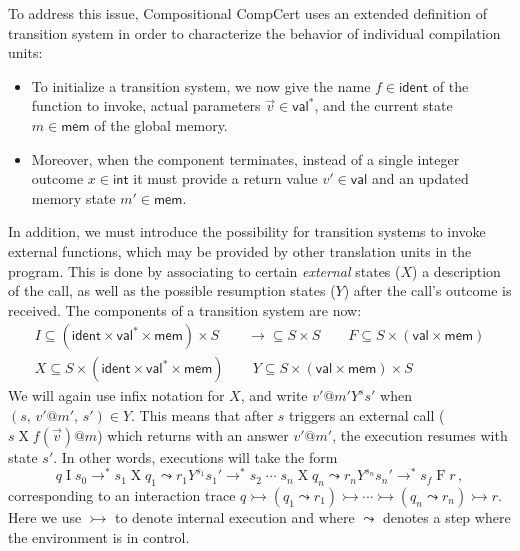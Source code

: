 \documentclass[acmsmall,screen,review,anonymous]{acmart}
\newcommand{\kw}[1]{\ensuremath{ \mathsf{#1} }}
\begin{document}
To address this issue,
Compositional CompCert \cite{compcompcert}
uses an extended definition of transition system
in order to
characterize the behavior of individual compilation units:
\begin{itemize}
\item
To initialize a transition system,
we now give the name $f \in \kw{ident}$
of the function to invoke,
actual parameters $\vec{v} \in \kw{val}^*$,
and the current state $m \in \kw{mem}$ of the global memory.
\item
Moreover,
when the component terminates,
instead of a single integer outcome $x \in \kw{int}$ it must provide
a return value $v' \in \kw{val}$ and an updated memory state $m' \in \kw{mem}$.
\end{itemize}
In addition,
we must introduce the possibility for transition systems
to invoke external functions,
which may be provided by other translation units in the program.
This is done by associating to certain \emph{external} states ($X$)
a description of the call,
as well as the possible resumption states ($Y$)
after the call's outcome is received.
The components of a transition system are now:
\begin{equation}
 \begin{array}{c}
  I \subseteq (\kw{ident} \times \kw{val}^* \times \kw{mem}) \times S
  \qquad
  {\rightarrow} \subseteq S \times S
  \qquad
  F \subseteq S \times (\kw{val} \times \kw{mem})
  \\
  X \subseteq S \times (\kw{ident} \times \kw{val}^* \times \kw{mem})
  \qquad
  Y \subseteq S \times (\kw{val} \times \kw{mem}) \times S
 \end{array}
 \label{eqn:compcomp-lts}
\end{equation}
We will again use infix notation for $X$,
and write $v'@m' \mathrel{Y^s} s'$ when $(s, \, v'@m', \, s') \in Y$.
This means that
after $s$ triggers an external call ($s \mathrel{X} f(\vec{v})@m$)
which returns with an answer $v'@m'$,
the execution resumes with state $s'$.
In other words,
executions will take the form
\[
  q \mathrel{I} s_0 \rightarrow^*
  s_1 \mathrel{X} q_1 \leadsto
  r_1 \mathrel{Y^{s_1}} s_1' \rightarrow^*
  s_2 \mathrel{\cdots}
  s_n \mathrel{X} q_n \leadsto
  r_n \mathrel{Y^{s_n}} s_n' \rightarrow^*
  s_f \mathrel{F} r
  \,,
\]
corresponding to an interaction trace
$
  q \rightarrowtail
  (q_1 \leadsto r_1) \rightarrowtail
  \cdots \rightarrowtail
  (q_n \leadsto r_n) \rightarrowtail
  r
$.
Here we use $\rightarrowtail$ to denote internal execution
and where $\leadsto$ denotes a step where the environment is in control.
\end{document}
